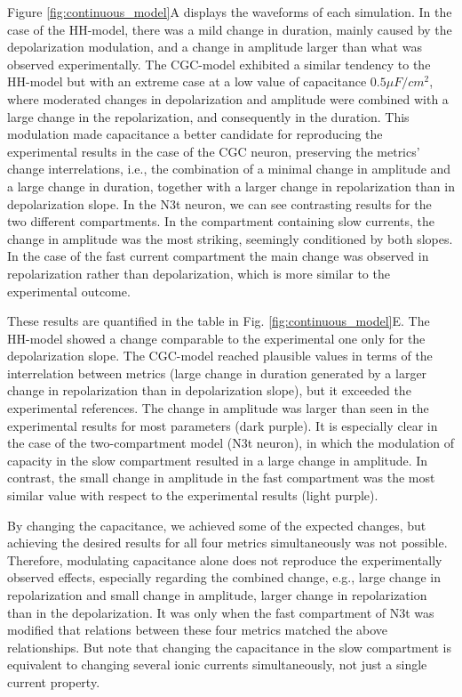 Figure \ref{fig:continuous_model}A displays the waveforms of each simulation. In the case of the HH-model, there was a mild change in duration, mainly caused by the depolarization modulation, and a change in amplitude larger than what was observed experimentally. The CGC-model exhibited a similar tendency to the HH-model but with an extreme case at a low value of capacitance $0.5 \mu F/cm^2$, where moderated changes in depolarization and amplitude were combined with a large change in the repolarization, and consequently in the duration. This modulation made capacitance a better candidate for reproducing the experimental results in the case of the CGC neuron, preserving the metrics' change interrelations, i.e., the combination of a minimal change in amplitude and a large change in duration, together with a larger change in repolarization than in depolarization slope. In the N3t neuron, we can see contrasting results for the two different compartments. In the compartment containing slow currents, the change in amplitude was the most striking, seemingly conditioned by both slopes. In the case of the fast current compartment the main change was observed in repolarization rather than depolarization, which is more similar to the experimental outcome. 

These results are quantified in the table in Fig. \ref{fig:continuous_model}E. The HH-model showed a change comparable to the experimental one only for the depolarization slope. The CGC-model reached plausible values in terms of the interrelation between metrics (large change in duration generated by a larger change in repolarization than in depolarization slope), but it exceeded the experimental references. The change in amplitude was larger than seen in the experimental results for most parameters (dark purple). It is especially clear in the case of the two-compartment model (N3t neuron), in which the modulation of capacity in the slow compartment resulted in a large change in amplitude. In contrast, the small change in amplitude in the fast compartment was the most similar value with respect to the experimental results (light purple).

By changing the capacitance, we achieved some of the expected changes, but achieving the desired results for all four metrics simultaneously was not possible. Therefore, modulating capacitance alone does not reproduce the experimentally observed effects, especially regarding the combined change, e.g., large change in repolarization and small change in amplitude, larger change in repolarization than in the depolarization. It was only when the fast compartment of N3t was modified that relations between these four metrics matched the above relationships. But note that changing the capacitance in the slow compartment is equivalent to changing several ionic currents simultaneously, not just a single current property. 

